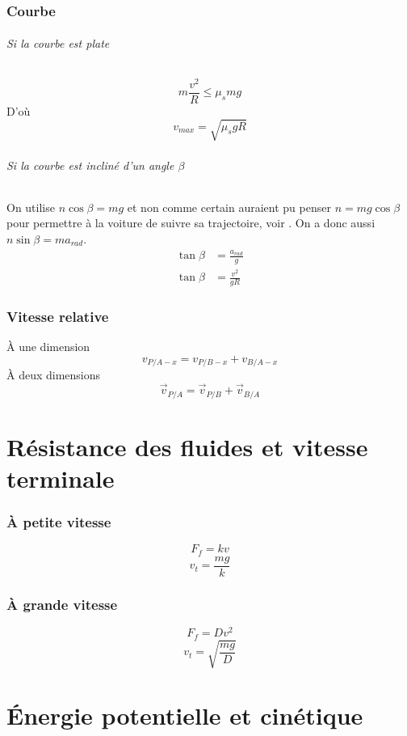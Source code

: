 \section{Courbe}
\paragraph{Si la courbe est plate}
\[ m\frac{v^2}{R} \leq \mu_smg \]
D'où
\[ v_{max} = \sqrt{\mu_s g R} \]
\paragraph{Si la courbe est incliné d'un angle $\beta$}
On utilise $n\cos\beta = mg$ et non comme certain auraient pu penser
$n = mg\cos\beta$ pour permettre à la voiture de suivre sa trajectoire,
voir \cite[p.~157]{young}.
On a donc aussi $n\sin\beta = ma_{rad}$.
\begin{align*}
  \tan{\beta} & = \frac{a_{rad}}{g}\\
  \tan{\beta} & = \frac{v^2}{gR}
\end{align*}

\section{Vitesse relative}
À une dimension
\[ v_{P/A-x} = v_{P/B-x} + v_{B/A-x} \]
À deux dimensions
\[ \vec{v}_{P/A} = \vec{v}_{P/B} + \vec{v}_{B/A} \]

\part{Résistance des fluides et vitesse terminale}
\section{À petite vitesse}
\[ F_f = kv \]
\[ v_t = \frac{mg}{k} \]
\section{À grande vitesse}
\[ F_f = Dv^2 \]
\[ v_t = \sqrt{ \frac{mg}{D} } \]

\part{Énergie potentielle et cinétique}
